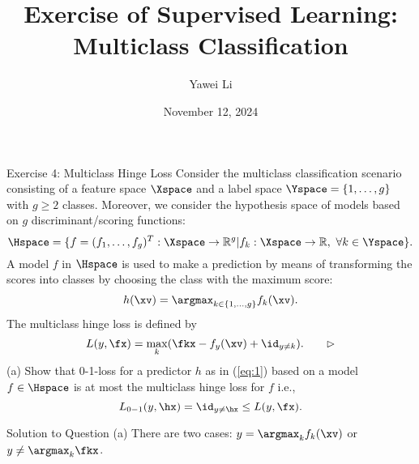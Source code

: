 \documentclass[aspectratio=169]{beamer}
\title[]{\textbf{Exercise of Supervised Learning: \\ Multiclass Classification}}
\author{Yawei Li}
\institute[LMU]
{
\\
  \texttt{yawei.li@stat.uni-muenchen.de}
}
\date{November 12, 2024}
\begin{document}
\begin{frame}
\titlepage

\end{frame}


\begin{frame}{Exercise 4: Multiclass Hinge Loss}
	\small
	Consider the multiclass classification scenario consisting of a feature space $\Xspace$ and a label space $\Yspace = \{1, \ldots, g\}$ with $g \geq 2 $ classes. Moreover, we consider the hypothesis space of models based on $g$ discriminant/scoring functions:
	$$\Hspace = \{ f = (f_1, \ldots, f_g)^T: \Xspace \to \mathbb{R}^g | f_k: \Xspace \to \mathbb{R},  \ \forall k \in \Yspace \}.$$
	A model $f$ in $\Hspace$ is used to make a prediction by means of transforming the scores into classes by choosing the class with the maximum score:
	\begin{align}
		h(\xv) = \argmax_{k \in \{1, \ldots, g \}} f_k(\xv).
		\label{eq:1}
	\end{align} 
	The multiclass hinge loss is defined by $$L(y, \fx) = \max_k (\fkx - f_y(\xv) + \id_{y \neq k}). \qquad \rhd$$
	(a) Show that 0-1-loss for a predictor $h$ as in (\ref{eq:1}) based on a model $f \in \Hspace$ is at most the multiclass hinge loss for $f$ i.e., $$L_{0-1}(y, \hx) = \id_{y\neq \hx} \leq L(y, \fx).$$
\end{frame}

\begin{frame}{Solution to Question (a)}
	\small
	There are two cases: $y = \argmax_{k} f_k(\xv)$ or $y \neq \argmax_k \fkx$.
	\vspace{10pt}
	
	
	
\end{frame}
\end{document}
